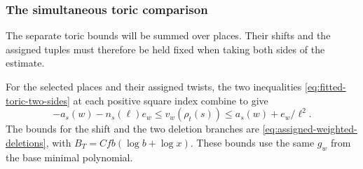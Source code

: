 \subsubsection{The simultaneous toric comparison}

The separate toric bounds will be summed over places. Their shifts and the assigned tuples must therefore be held fixed when taking both sides of the estimate.

\begin{proposition}\label{prop:fitted-toric-assigned-bounds}
For the selected places and their assigned twists, the two inequalities \eqref{eq:fitted-toric-two-sides} at each positive square index combine to give
\[
 -a_s(w)-n_s(\ell)e_w\le v_w(\rho_t(s))\le a_s(w)+e_w/\ell^2.
\]
 The bounds for the shift and the two deletion branches are
\eqref{eq:assigned-weighted-deletions}, with \(B_T=Cfb(\log b+\log x)\).
These bounds use the same \(g_w\) from the base minimal polynomial.
\end{proposition}

